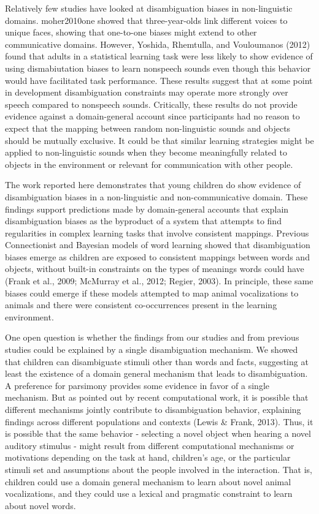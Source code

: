 \documentclass[english,floatsintext,man]{apa6}
\theoremstyle{definition}
\theoremstyle{definition}
\theoremstyle{definition}
\theoremstyle{remark}
\begin{document}
Relatively few studies have looked at disambiguation biases in
non-linguistic domains. moher2010one showed that three-year-olds link
different voices to unique faces, showing that one-to-one biases might
extend to other communicative domains. However, Yoshida, Rhemtulla, and
Vouloumanos (2012) found that adults in a statistical learning task were
less likely to show evidence of using dismabiutation biases to learn
nonspeech sounds even though this behavior would have facilitated task
performance. These results suggest that at some point in development
disambiguation constraints may operate more strongly over speech
compared to nonspeech sounds. Critically, these results do not provide
evidence against a domain-general account since participants had no
reason to expect that the mapping between random non-linguistic sounds
and objects should be mutually exclusive. It could be that similar
learning strategies might be applied to non-linguistic sounds when they
become meaningfully related to objects in the environment or relevant
for communication with other people.

The work reported here demonstrates that young children do show evidence
of disambiguation biases in a non-linguistic and non-communicative
domain. These findings support predictions made by domain-general
accounts that explain disambiguation biases as the byproduct of a system
that attempts to find regularities in complex learning tasks that
involve consistent mappings. Previous Connectionist and Bayesian models
of word learning showed that disambiguation biases emerge as children
are exposed to consistent mappings between words and objects, without
built-in constraints on the types of meanings words could have (Frank et
al., 2009; McMurray et al., 2012; Regier, 2003). In principle, these
same biases could emerge if these models attempted to map animal
vocalizations to animals and there were consistent co-occurrences
present in the learning environment.

One open question is whether the findings from our studies and from
previous studies could be explained by a single disambiguation
mechanism. We showed that children can disambiguate stimuli other than
words and facts, suggesting at least the existence of a domain general
mechanism that leads to disambiguation. A preference for parsimony
provides some evidence in favor of a single mechanism. But as pointed
out by recent computational work, it is possible that different
mechanisms jointly contribute to disambiguation behavior, explaining
findings across different populations and contexts (Lewis \& Frank,
2013). Thus, it is possible that the same behavior - selecting a novel
object when hearing a novel auditory stimulus - might result from
different computational mechanisms or motivations depending on the task
at hand, children's age, or the particular stimuli set and assumptions
about the people involved in the interaction. That is, children could
use a domain general mechanism to learn about novel animal
vocalizations, and they could use a lexical and pragmatic constraint to
learn about novel words.
\end{document}
